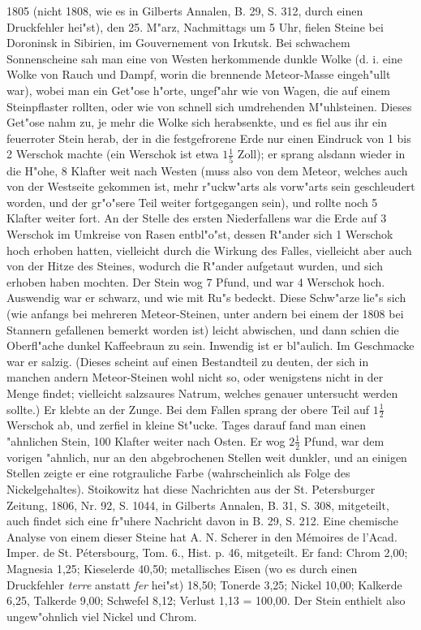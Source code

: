 \documentclass[a4paper, 11pt, oneside, polutonikogreek, german]{article}
\begin{document}
1805 (nicht 1808, wie es in Gilberts Annalen, B. 29, S. 312, durch einen Druckfehler hei"st), den 25. M"arz, Nachmittags um 5 Uhr, fielen Steine bei Doroninsk in Sibirien, im Gouvernement von Irkutsk. Bei schwachem Sonnenscheine sah man eine von Westen herkommende dunkle Wolke (d. i. eine Wolke von Rauch und Dampf, worin die brennende Meteor-Masse eingeh"ullt war), wobei man ein Get"ose h"orte, ungef"ahr wie von Wagen, die auf einem Steinpflaster rollten, oder wie von schnell sich umdrehenden M"uhlsteinen. Dieses Get"ose nahm zu, je mehr die Wolke sich herabsenkte, und es fiel aus ihr ein feuerroter Stein herab, der in die festgefrorene Erde nur einen Eindruck von 1 bis 2 Werschok machte (ein Werschok ist etwa $\mathfrak{1\frac{1}{5}}$ Zoll); er sprang alsdann wieder in die H"ohe, 8 Klafter weit nach Westen (muss also von dem Meteor, welches auch von der Westseite gekommen ist, mehr r"uckw"arts als vorw"arts sein geschleudert worden, und der gr"o"sere Teil weiter fortgegangen sein), und rollte noch 5 Klafter weiter fort. An der Stelle des ersten Niederfallens war die Erde auf 3 Werschok im Umkreise von Rasen entbl"o"st, dessen R"ander sich 1 Werschok hoch erhoben hatten, vielleicht durch die Wirkung des Falles, vielleicht aber auch von der Hitze des Steines, wodurch die R"ander aufgetaut wurden, und sich erhoben haben mochten. Der Stein wog 7 Pfund, und war 4 Werschok hoch. Auswendig war er schwarz, und wie mit Ru"s bedeckt. Diese Schw"arze lie"s sich (wie anfangs bei mehreren Meteor-Steinen, unter andern bei einem der 1808 bei Stannern gefallenen bemerkt worden ist) leicht abwischen, und dann schien die Oberfl"ache dunkel Kaffeebraun zu sein. Inwendig ist er bl"aulich. Im Geschmacke war er salzig. (Dieses scheint auf einen Bestandteil zu deuten, der sich in manchen andern Meteor-Steinen wohl nicht so, oder wenigstens nicht in der Menge findet; vielleicht salzsaures Natrum, welches genauer untersucht werden sollte.) Er klebte an der Zunge. Bei dem Fallen sprang der obere Teil auf $\mathfrak{1\frac{1}{2}}$ Werschok ab, und zerfiel in kleine St"ucke. Tages darauf fand man einen "ahnlichen Stein, 100 Klafter weiter nach Osten. Er wog $\mathfrak{2\frac{1}{2}}$ Pfund, war dem vorigen "ahnlich, nur an den abgebrochenen Stellen weit dunkler, und an einigen Stellen zeigte er eine rotgrauliche Farbe (wahrscheinlich als Folge des Nickelgehaltes). Stoikowitz hat diese Nachrichten aus der St. Petersburger Zeitung, 1806, Nr. 92, S. 1044, in Gilberts Annalen, B. 31, S. 308, mitgeteilt, auch findet sich eine fr"uhere Nachricht davon in B. 29, S. 212. Eine chemische Analyse von einem dieser Steine hat A. N. Scherer in den Mémoires de l'Acad. Imper. de St. Pétersbourg, Tom. 6., Hist. p. 46, mitgeteilt. Er fand: Chrom 2,00; Magnesia 1,25; Kieselerde 40,50; metallisches Eisen (wo es durch einen Druckfehler \emph{terre} anstatt \emph{fer} hei"st) 18,50; Tonerde 3,25; Nickel 10,00; Kalkerde 6,25, Talkerde 9,00; Schwefel 8,12; Verlust 1,13 = 100,00. Der Stein enthielt also ungew"ohnlich viel Nickel und Chrom.
\end{document}
